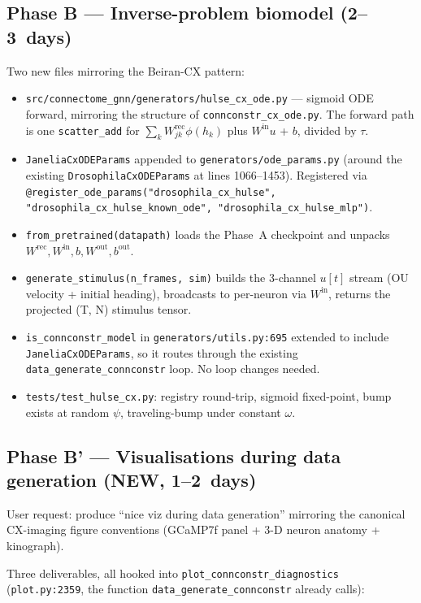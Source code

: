 \documentclass[11pt]{article}
\begin{document}
\subsection*{Phase B --- Inverse-problem biomodel (2--3~days)}

Two new files mirroring the Beiran-CX pattern:

\begin{itemize}[leftmargin=*]
\item \texttt{src/connectome\_gnn/generators/hulse\_cx\_ode.py} --- sigmoid
  ODE forward, mirroring the structure of
  \texttt{connconstr\_cx\_ode.py}. The forward path is one
  \texttt{scatter\_add} for $\sum_k W^{\text{rec}}_{jk}\phi(h_k)$ plus
  $W^{\text{in}}u$ + $b$, divided by $\tau$.
\item \texttt{JaneliaCxODEParams} appended to
  \texttt{generators/ode\_params.py} (around the existing
  \texttt{DrosophilaCxODEParams} at lines 1066--1453). Registered via
  \texttt{@register\_ode\_params("drosophila\_cx\_hulse", "drosophila\_cx\_hulse\_known\_ode", "drosophila\_cx\_hulse\_mlp")}.
\item \texttt{from\_pretrained(datapath)} loads the Phase~A checkpoint and
  unpacks $W^{\text{rec}}, W^{\text{in}}, b, W^{\text{out}}, b^{\text{out}}$.
\item \texttt{generate\_stimulus(n\_frames, sim)} builds the 3-channel
  $u[t]$ stream (OU velocity + initial heading), broadcasts to per-neuron
  via $W^{\text{in}}$, returns the projected (T, N) stimulus tensor.
\item \texttt{is\_connconstr\_model} in
  \texttt{generators/utils.py:695} extended to include
  \texttt{JaneliaCxODEParams}, so it routes through the existing
  \texttt{data\_generate\_connconstr} loop. No loop changes needed.
\item \texttt{tests/test\_hulse\_cx.py}: registry round-trip, sigmoid
  fixed-point, bump exists at random $\psi$, traveling-bump under
  constant $\omega$.
\end{itemize}

\subsection*{Phase B' --- Visualisations during data generation (NEW, 1--2~days)}

User request: produce ``nice viz during data generation'' mirroring the
canonical CX-imaging figure conventions (GCaMP7f panel + 3-D neuron
anatomy + kinograph).

Three deliverables, all hooked into
\texttt{plot\_connconstr\_diagnostics}
(\texttt{plot.py:2359}, the function \texttt{data\_generate\_connconstr}
already calls):
\end{document}
